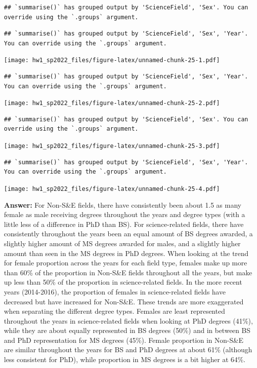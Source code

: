 \documentclass[
]{article}
\begin{document}
\begin{verbatim}
## `summarise()` has grouped output by 'ScienceField', 'Sex'. You can override using the `.groups` argument.
\end{verbatim}

\begin{verbatim}
## `summarise()` has grouped output by 'ScienceField', 'Sex', 'Year'. You can override using the `.groups` argument.
\end{verbatim}

\texttt{[image: hw1\_sp2022\_files/figure-latex/unnamed-chunk-25-1.pdf]}

\begin{verbatim}
## `summarise()` has grouped output by 'ScienceField', 'Sex', 'Year'. You can override using the `.groups` argument.
\end{verbatim}

\texttt{[image: hw1\_sp2022\_files/figure-latex/unnamed-chunk-25-2.pdf]}

\begin{verbatim}
## `summarise()` has grouped output by 'ScienceField', 'Sex'. You can override using the `.groups` argument.
\end{verbatim}

\texttt{[image: hw1\_sp2022\_files/figure-latex/unnamed-chunk-25-3.pdf]}

\begin{verbatim}
## `summarise()` has grouped output by 'ScienceField', 'Sex', 'Year'. You can override using the `.groups` argument.
\end{verbatim}

\texttt{[image: hw1\_sp2022\_files/figure-latex/unnamed-chunk-25-4.pdf]}

\textbf{Answer:} For Non-S\&E fields, there have consistently been about
1.5 as many female as male receiving degrees throughout the years and
degree types (with a little less of a difference in PhD than BS). For
science-related fields, there have consistently throughout the years
been an equal amount of BS degrees awarded, a slightly higher amount of
MS degrees awarded for males, and a slightly higher amount than seen in
the MS degrees in PhD degrees. When looking at the trend for female
proportion across the years for each field type, females make up more
than 60\% of the proportion in Non-S\&E fields throughout all the years,
but make up less than 50\% of the proportion in science-related fields.
In the more recent years (2014-2016), the proportion of females in
science-related fields have decreased but have increased for Non-S\&E.
These trends are more exaggerated when separating the different degree
types. Females are least represented throughout the years in
science-related fields when looking at PhD degrees (41\%), while they
are about equally represented in BS degrees (50\%) and in between BS and
PhD representation for MS degrees (45\%). Female proportion in Non-S\&E
are similar throughout the years for BS and PhD degrees at about 61\%
(although less consistent for PhD), while proportion in MS degrees is a
bit higher at 64\%.
\end{document}
